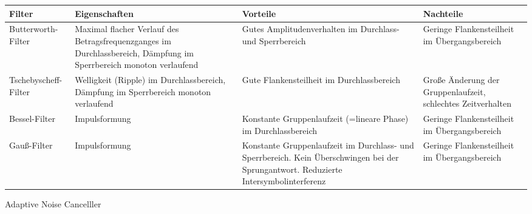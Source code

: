 \documentclass[10pt, a4paper]{exam}
\begin{document}
\begin{questions}
\begin{parts}
\begin{solution}
      \begin{tabular}{p{3cm}|p{3cm}|p{3cm}|p{3cm}}
        Filter               & Eigenschaften                                                                                                      & Vorteile                                                                                                                              & Nachteile                                                    \\\hline
        Butterworth-Filter   & Maximal flacher Verlauf des Betragsfrequenzganges im Durchlassbereich, Dämpfung im Sperrbereich monoton verlaufend & Gutes Amplitudenverhalten im Durchlass- und Sperrbereich                                                                              & Geringe Flankensteilheit im Übergangsbereich                 \\
        Tschebyscheff-Filter & Welligkeit (Ripple) im Durchlassbereich, Dämpfung im Sperrbereich monoton verlaufend                               & Gute Flankensteilheit im Durchlassbereich                                                                                             & Große Änderung der Gruppenlaufzeit, schlechtes Zeitverhalten \\
        Bessel-Filter        & Impulsformung                                                                                                      & Konstante Gruppenlaufzeit (=lineare Phase) im Durchlassbereich                                                                        & Geringe Flankensteilheit im Übergangsbereich                 \\
        Gauß-Filter          & Impulsformung                                                                                                      & Konstante Gruppenlaufzeit im Durchlass- und Sperrbereich. Kein Überschwingen bei der Sprungantwort. Reduzierte Intersymbolinterferenz & Geringe Flankensteilheit im Übergangsbereich
      \end{tabular}
    \end{solution}
  \end{parts}

  \question Adaptive Noise Cancelller
\end{questions}
\end{document}

